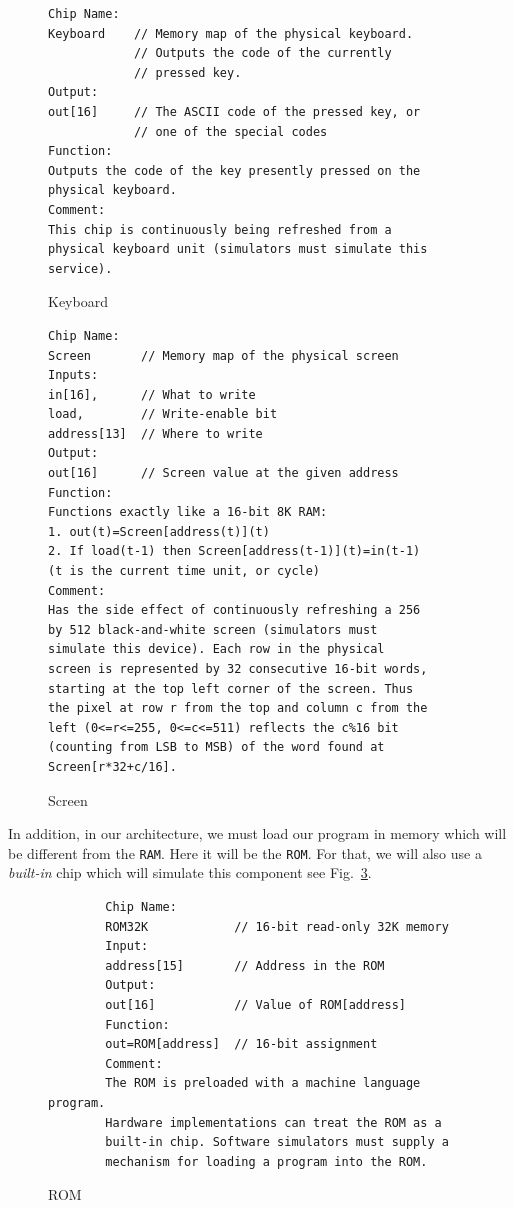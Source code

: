 \documentclass[11pt]{article}
\begin{document}
\begin{figure}[]
  \centering
\begin{verbatim}
Chip Name:
Keyboard    // Memory map of the physical keyboard.
            // Outputs the code of the currently
            // pressed key.
Output:
out[16]     // The ASCII code of the pressed key, or
            // one of the special codes
Function:
Outputs the code of the key presently pressed on the
physical keyboard.
Comment:
This chip is continuously being refreshed from a
physical keyboard unit (simulators must simulate this
service).
\end{verbatim}

  \caption{Keyboard}
  \label{fig:keyboard}
\end{figure}
\begin{figure}[]
  \centering
\begin{verbatim}
Chip Name:
Screen       // Memory map of the physical screen
Inputs:
in[16],      // What to write
load,        // Write-enable bit
address[13]  // Where to write
Output:
out[16]      // Screen value at the given address
Function:
Functions exactly like a 16-bit 8K RAM:
1. out(t)=Screen[address(t)](t)
2. If load(t-1) then Screen[address(t-1)](t)=in(t-1)
(t is the current time unit, or cycle)
Comment:
Has the side effect of continuously refreshing a 256
by 512 black-and-white screen (simulators must
simulate this device). Each row in the physical
screen is represented by 32 consecutive 16-bit words,
starting at the top left corner of the screen. Thus
the pixel at row r from the top and column c from the
left (0<=r<=255, 0<=c<=511) reflects the c%16 bit
(counting from LSB to MSB) of the word found at
Screen[r*32+c/16].
\end{verbatim}

  \caption{Screen}
  \label{fig:screen}
\end{figure}

 In addition, in our architecture, we must load our program in memory which will be different from the \texttt{RAM}. Here it will be the \texttt{ROM}. For that, we will also use a \textit{built-in} chip which will simulate this component see Fig.~\ref{fig:rom}.
 \begin{figure}[]
 	\centering
 	\begin{verbatim}
 		Chip Name:
 		ROM32K            // 16-bit read-only 32K memory
 		Input:
 		address[15]       // Address in the ROM
 		Output:
 		out[16]           // Value of ROM[address]
 		Function:
 		out=ROM[address]  // 16-bit assignment
 		Comment:
 		The ROM is preloaded with a machine language program.
 		Hardware implementations can treat the ROM as a
 		built-in chip. Software simulators must supply a
 		mechanism for loading a program into the ROM.
 	\end{verbatim}
 	\caption{ROM}
 	\label{fig:rom}
 \end{figure}
\pagebreak
\end{document}
